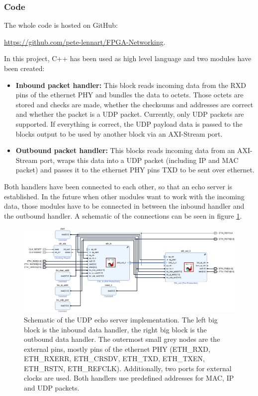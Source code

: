 \subsubsection{Code}
The whole code is hosted on GitHub:
\begin{center}
    \url{https://github.com/pete-lennart/FPGA-Networking}.
\end{center}
In this project, C++ has been used as high level language and two modules have been created:
\begin{itemize}
  \item \textbf{Inbound packet handler:} This block reads incoming data from the RXD pins of the ethernet PHY and bundles the data to octets. Those octets are stored and checks are made, whether the checksums and addresses are correct and whether the packet is a UDP packet. Currently, only UDP packets are supported. If everything is correct, the UDP payload data is passed to the blocks output to be used by another block via an AXI-Stream port.
  \item \textbf{Outbound packet handler:} This blocks reads incoming data from an AXI-Stream port, wraps this data into a UDP packet (including IP and MAC packet) and passes it to the ethernet PHY pins TXD to be sent over ethernet.
\end{itemize}
Both handlers have been connected to each other, so that an echo server is established. In the future when other modules want to work with the incoming data, those modules have to be connected in between the inbound handler and the outbound handler.
A schematic of the connections can be seen in figure \ref{figure:schematic}.

\begin{figure}
  \includegraphics[width=\textwidth]{assets/schematic.png}
  \caption[Schematic of the UDP echo server implementation]{Schematic of the UDP echo server implementation. The left big block is the inbound data handler, the right big block is the outbound data handler. The outermost small grey nodes are the external pins, mostly pins of the ethernet PHY (ETH\_RXD, ETH\_RXERR, ETH\_CRSDV, ETH\_TXD, ETH\_TXEN, ETH\_RSTN, ETH\_REFCLK). Additionally, two ports for external clocks are used. Both handlers use predefined addresses for MAC, IP and UDP packets.}
  \label{figure:schematic}
\end{figure}

